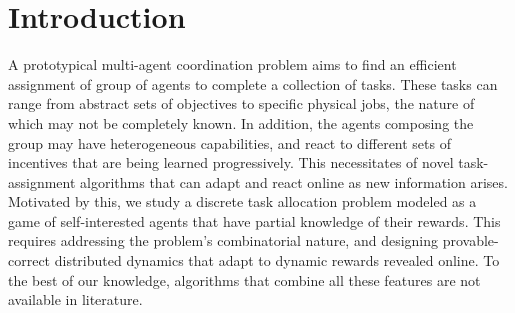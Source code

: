 \documentclass{IEEEtran}
\newcommand{\marginn}[1]{\marginpar{\color{blue}\tiny\ttfamily#1}}
\newcommand{\margin}[1]{\marginpar{\color{magenta}\tiny\ttfamily#1}}
\begin{document}
\section{Introduction}\label{sec:intro}
A prototypical multi-agent coordination problem aims to find an
efficient assignment of group of agents to complete a collection of
tasks.  These tasks can range from abstract sets of objectives to
specific physical jobs, the nature of which may not be completely
known. In addition, the agents composing the group may have
heterogeneous capabilities, and react to different sets of incentives
that are being learned progressively. This necessitates of novel
task-assignment algorithms that can adapt and react online as new
information arises. Motivated by this, we study a discrete task
allocation problem modeled as a game of self-interested agents that
have partial knowledge of their rewards. This requires addressing the
problem's combinatorial nature, and designing provable-correct
distributed dynamics that adapt to dynamic rewards revealed online. To
the best of our knowledge, algorithms that combine all these features
are not available in literature.
\end{document}
